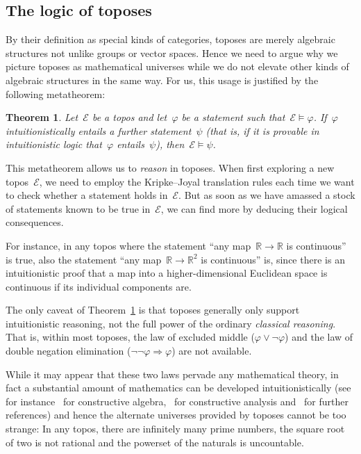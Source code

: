 \documentclass[oneside,reqno]{amsart}
\theoremstyle{definition}
\theoremstyle{plain}
\newtheorem{thm}[defn]{Theorem}
\theoremstyle{remark}
\newcommand{\E}{\mathcal{E}}
\newcommand{\RR}{\mathbb{R}}
\renewcommand{\_}{\mathpunct{.}\,}
\newcommand{\?}{\,{:}\,}
\begin{document}
\subsection{The logic of toposes} By their definition as special kinds of
categories, toposes are merely algebraic structures not unlike groups or vector
spaces. Hence we need to argue why we picture toposes as mathematical universes
while we do not elevate other kinds of algebraic structures in the same way.
For us, this usage is justified by the following metatheorem:

\begin{thm}\label{thm:reasoning}Let~$\E$ be a topos and let~$\varphi$ be a
statement such that~$\E \models \varphi$. If~$\varphi$ intuitionistically
entails a further statement~$\psi$ (that is, if it is provable in
intuitionistic logic that~$\varphi$ entails~$\psi$), then~$\E \models
\psi$.\end{thm}

This metatheorem allows us to \emph{reason} in toposes. When first exploring a
new topos~$\E$, we need to employ the Kripke--Joyal translation rules each time
we want to check whether a statement holds in~$\E$. But as soon as we
have amassed a stock of statements known to be true in~$\E$, we can find more
by deducing their logical consequences.

For instance, in any topos where the statement ``any map~$\RR \to \RR$ is
continuous'' is true, also the statement ``any map~$\RR \to \RR^2$ is
continuous'' is, since there is an intuitionistic proof that a map into a
higher-dimensional Euclidean space is continuous if its individual components
are.

The only caveat of Theorem~\ref{thm:reasoning} is that toposes generally only
support intuitionistic reasoning, not the full power of the ordinary
\emph{classical reasoning}. That is, within most toposes, the law of excluded
middle ($\varphi \vee \neg\varphi$) and the law of double negation elimination
($\neg\neg\varphi \Rightarrow \varphi$) are not available.

While it may appear that these two laws pervade any mathematical theory, in
fact a substantial amount of mathematics can be developed intuitionistically
(see for
instance~\cite{mines-richman-ruitenburg:constructive-algebra,lombardi-quitte:constructive-algebra}
for constructive algebra,~\cite{bishop-bridges:constructive-analysis} for
constructive analysis
and~\cite{bauer:int-mathematics,bauer:video,melikhov:intuitionistic-logic} for
further references) and hence the alternate universes provided by toposes
cannot be too strange: In any topos, there are infinitely many prime numbers,
the square root of two is not rational and the powerset of the naturals is
uncountable.
\end{document}
